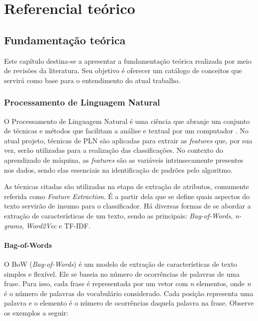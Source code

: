 \part{Referencial teórico}

\chapter[Fundamentação teórica]{Fundamentação teórica}

Este capítulo destina-se a apresentar a fundamentação teórica realizada por meio de revisões da literatura. Seu objetivo é oferecer um catálogo de conceitos que servirá como base para o entendimento do atual trabalho.

\section[Processamento de Linguagem	 Natural]{Processamento de Linguagem Natural}

O Processamento de Linguagem Natural é uma ciência que abranje um conjunto de técnicas e métodos que facilitam a análise e textual por um computador \cite{aranha}. 
No atual projeto, técnicas de PLN são aplicadas para extrair as \textit{features} que, por sua vez, serão utilizadas para a realização das classificações. No contexto do aprendizado de máquina, as \textit{features} são as variáveis intrinsecamente presentes nos dados, sendo elas essenciais na identificação de padrões pelo algoritmo.

As técnicas citadas são utilizadas na etapa de extração de atributos, comumente referida como \textit{Feature Extraction}. É a partir dela que se define quais aspectos do texto servirão de insumo para o classificador. Há diversas formas de se abordar a extração de características de um texto, sendo as principais: \textit{Bag-of-Words}, \textit{n-grams}, \textit{Word2Vec} e TF-IDF.

\subsection{Bag-of-Words}

O BoW (\textit{Bag-of-Words}) é um modelo de extração de características de texto simples e flexível. Ele se baseia no número de ocorrências de palavras de uma frase. Para isso, cada frase é representada por um vetor com \textit{n} elementos, onde \textit{n} é o número de palavras do vocabulário considerado. Cada posição representa uma palavra e o elemento é o número de ocorrências daquela palavra na frase. Observe os exemplos a seguir:

